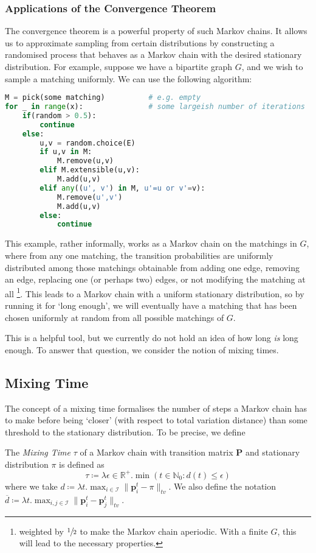 	\subsubsection{Applications of the Convergence Theorem}
		The convergence theorem is a powerful property of such Markov chains. It allows us 
		to approximate sampling from certain distributions by constructing a randomised 
		process that behaves as a Markov chain with the desired stationary distribution.
		For example, suppose we have a bipartite graph $G$, and we wish to sample a 
		matching uniformly. We can use the following algorithm:
		\begin{lstlisting}[caption=Matching Generator,language=python,style=mystyle]
M = pick(some matching)          # e.g. empty
for _ in range(x):               # some largeish number of iterations
	if(random > 0.5):
		continue
	else:
		u,v = random.choice(E)
		if u,v in M:
			M.remove(u,v)
		elif M.extensible(u,v):
			M.add(u,v)
		elif any((u', v') in M, u'=u or v'=v):
			M.remove(u',v')
			M.add(u,v)
		else:
			continue
		\end{lstlisting}
		This example, rather informally, works as a Markov chain on the matchings in $G$, 
		where from any one matching, the transition probabilities are uniformly 
		distributed among those matchings obtainable from adding one edge, removing an 
		edge, replacing one (or perhaps two) edges, or not modifying the matching at all
		\footnote{weighted by $\sfrac{1}{2}$ to make the Markov chain aperiodic. With a 
		finite $G$, this will lead to the necessary properties.}. This leads to a Markov
		chain with a uniform stationary distribution, so by running it for `long 
		enough', we will eventually have a matching that has been chosen uniformly at 
		random from all possible matchings of $G$. \par
		This is a helpful tool, but we currently do not hold an idea of how long 
		\emph{is} long enough. To answer that question, we consider the notion of mixing 
		times.

	\subsection{Mixing Time}
		The concept of a mixing time formalises the number of steps a Markov chain has 
		to make before being `closer' (with respect to total variation distance) than 
		some threshold to the stationary distribution. To be precise, we define
		\begin{definition}
			The \emph{Mixing Time} $\tau$ of a Markov chain with transition matrix 
			$\mathbf{P}$ and stationary distribution $\pi$ is defined as 
			$$
				\tau \coloneqq \lambda \epsilon \in \mathbb{R}^+ .
				\min(t \in \mathbb{N}_0 : d(t) \leq \epsilon)
			$$
			where we take $d \coloneqq \lambda t . \max_{i \in \mathcal{I}}
			\|\mathbf{p}^t_i - \pi\|_{tv}$. 
			We also define the notation $\overline{d} \coloneqq 
			\lambda t. \max_{i,j \in \mathcal{I}} \|\mathbf{p}^t_i - 
			\mathbf{p}^t_j\|_{tv}$.
		\end{definition}

